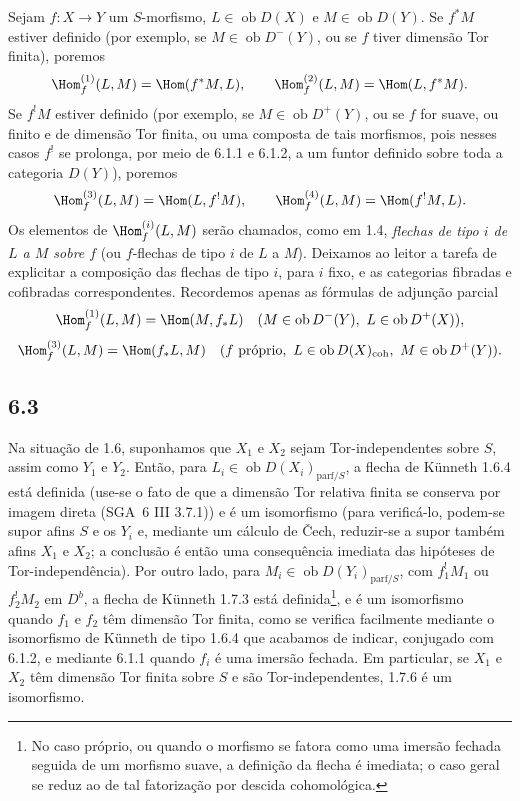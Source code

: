 Sejam $f:X\to Y$ um $S$-morfismo, $L\in\operatorname{ob}D(X)$ e $M\in\operatorname{ob}D(Y)$. Se $f^*M$ estiver definido (por exemplo, se $M\in\operatorname{ob}D^-(Y)$, ou se $f$ tiver dimensão Tor finita), poremos
\[
\Hom_f^{(1)}(L,M)=\Hom(f^*M,L),\qquad
\Hom_f^{(2)}(L,M)=\Hom(L,f^*M).
\]
Se $f^!M$ estiver definido (por exemplo, se $M\in\operatorname{ob}D^+(Y)$, ou se $f$ for suave, ou finito e de dimensão Tor finita, ou uma composta de tais morfismos, pois nesses casos $f^!$ se prolonga, por meio de 6.1.1 e 6.1.2, a um funtor definido sobre toda a categoria $D(Y)$), poremos
\[
\Hom_f^{(3)}(L,M)=\Hom(L,f^!M),\qquad
\Hom_f^{(4)}(L,M)=\Hom(f^!M,L).
\]
Os elementos de $\Hom_f^{(i)}(L,M)$ serão chamados, como em 1.4, \emph{flechas de tipo $i$ de $L$ a $M$ sobre $f$} (ou $f$-flechas de tipo $i$ de $L$ a $M$). Deixamos ao leitor a tarefa de explicitar a composição das flechas de tipo $i$, para $i$ fixo, e as categorias fibradas e cofibradas correspondentes. Recordemos apenas as fórmulas de adjunção parcial
\[
\Hom_f^{(1)}(L,M)=\Hom(M,f_*L)\quad(M\in\operatorname{ob}D^{-}(Y),\ L\in\operatorname{ob}D^+(X)),
\]
\[
\Hom_f^{(3)}(L,M)=\Hom(f_*L,M)\quad(f\text{ próprio},\ L\in\operatorname{ob}D(X)_{\mathrm{coh}},\ M\in\operatorname{ob}D^+(Y)).
\]

\subsection*{6.3}
Na situação de 1.6, suponhamos que $X_1$ e $X_2$ sejam Tor-independentes sobre $S$, assim como $Y_1$ e $Y_2$. Então, para $L_i\in\operatorname{ob}D(X_i)_{\mathrm{parf}/S}$, a flecha de Künneth 1.6.4 está definida (use-se o fato de que a dimensão Tor relativa finita se conserva por imagem direta (SGA~6 III 3.7.1)) e é um isomorfismo (para verificá-lo, podem-se supor afins $S$ e os $Y_i$ e, mediante um cálculo de Čech, reduzir-se a supor também afins $X_1$ e $X_2$; a conclusão é então uma consequência imediata das hipóteses de Tor-independência). Por outro lado, para $M_i\in\operatorname{ob}D(Y_i)_{\mathrm{parf}/S}$, com $f_1^!M_1$ ou $f_2^!M_2$ em $D^b$, a flecha de Künneth 1.7.3 está definida\footnote{No caso próprio, ou quando o morfismo se fatora como uma imersão fechada seguida de um morfismo suave, a definição da flecha é imediata; o caso geral se reduz ao de tal fatorização por descida cohomológica.}, e é um isomorfismo quando $f_1$ e $f_2$ têm dimensão Tor finita, como se verifica facilmente mediante o isomorfismo de Künneth de tipo 1.6.4 que acabamos de indicar, conjugado com 6.1.2, e mediante 6.1.1 quando $f_i$ é uma imersão fechada. Em particular, se $X_1$ e $X_2$ têm dimensão Tor finita sobre $S$ e são Tor-independentes, 1.7.6 é um isomorfismo.

